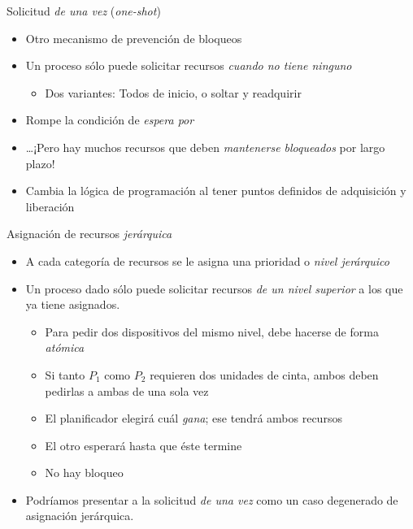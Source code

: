 \documentclass[presentation]{beamer}
\begin{document}
\begin{frame}[label={sec:orgd5f098d}]{Solicitud \emph{de una vez} (\emph{one-shot})}
\begin{itemize}
\item Otro mecanismo de prevención de bloqueos
\item Un proceso sólo puede solicitar recursos \emph{cuando no tiene ninguno}
\begin{itemize}
\item Dos variantes: Todos de inicio, o soltar y readquirir
\end{itemize}
\item Rompe la condición de \emph{espera por}
\item \ldots{}¡Pero hay muchos recursos que deben \emph{mantenerse bloqueados} por
largo plazo!
\item Cambia la lógica de programación al tener puntos definidos de
adquisición y liberación
\end{itemize}
\end{frame}

\begin{frame}[label={sec:org39dd7a9}]{Asignación de recursos \emph{jerárquica}}
\begin{itemize}
\item A cada categoría de recursos se le asigna una prioridad o \emph{nivel jerárquico}
\item Un proceso dado sólo puede solicitar recursos \emph{de un nivel superior}
a los que ya tiene asignados.
\begin{itemize}
\item Para pedir dos dispositivos del mismo nivel, debe hacerse de
forma \emph{atómica}
\item Si tanto \(P_1\) como \(P_2\) requieren dos unidades de cinta, ambos
deben pedirlas a ambas de una sola vez
\item El planificador elegirá cuál \emph{gana}; ese tendrá ambos recursos
\item El otro esperará hasta que éste termine
\item No hay bloqueo
\end{itemize}
\item Podríamos presentar a la solicitud \emph{de una vez} como un caso
degenerado de asignación jerárquica.
\end{itemize}
\end{frame}
\end{document}

